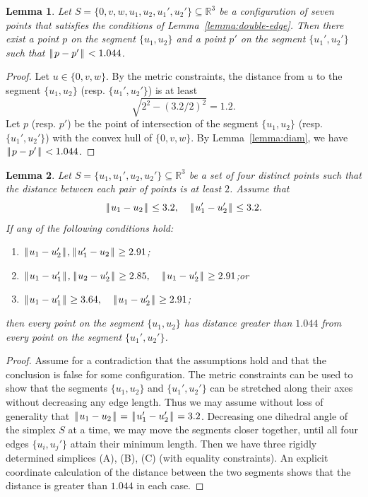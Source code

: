 \documentclass[11pt]{amsart}
\newcommand{\ring}[1]{\mathbb{#1}}
\def\|{{\hskip0.1em|\hskip-0.15em|\hskip0.1em}}
\let\subset=\subseteq
\newtheorem{lemma}{Lemma}
\begin{document}
\begin{lemma}\label{lemma:7small}  
Let $S=\{0,v,w,u_1,u_2,u_1',u_2'\}\subset\ring{R}^3$
be a configuration of seven points that satisfies
the conditions of Lemma~\ref{lemma:double-edge}.  Then there exist
a point $p$ on the segment $\{u_1,u_2\}$ and  a point $p'$ on the segment
$\{u_1',u_2'\}$ such that $\|p-p'\|<1.044$.
\end{lemma}

\begin{proof} Let $u\in\{0,v,w\}$.  By the metric constraints, the
distance from $u$ to the segment $\{u_1,u_2\}$ (resp. $\{u_1',u_2'\}$) is at least
$$\sqrt{2^2 - (3.2/2)^2} = 1.2.$$
Let $p$ (resp. $p'$) be the point of intersection of the segment $\{u_1,u_2\}$ 
(resp. $\{u_1',u_2'\}$) with
the convex hull of $\{0,v,w\}$.  By Lemma~\ref{lemma:diam},
we have $\|p-p'\|<1.044$.
\end{proof}

\begin{lemma}\label{lemma:abc}
Let $S=\{u_1,u_1',u_2,u_2'\}\subset\ring{R}^3$ be a set of four distinct points such that the distance between each pair of points is at least $2$.  Assume that
$$
\|u_1-u_2\|\le 3.2,\quad \|u_1'-u_2'\|\le 3.2.
$$
If any of the following conditions hold:
{
\renewcommand{\labelenumi}{(\Alph{enumi})~~}
\begin{enumerate}
\item $\|u_1-u_2'\|,\|u_1'-u_2\|\ge 2.91$;
\item $\|u_1-u_1'\|,\|u_2-u_2'\|\ge 2.85,\quad \|u_1-u_2'\|\ge 2.91$;\quad or
\item $\|u_1-u_1'\|\ge 3.64,\quad \|u_1-u_2'\|\ge 2.91$;
\end{enumerate}
}
then every point on the segment $\{u_1,u_2\}$ has distance greater than $1.044$ from every point on the segment $\{u_1',u_2'\}$.
\end{lemma}

\begin{proof} Assume for a contradiction that the assumptions hold and that
the conclusion is false for some configuration.  The metric constraints can be used to show that the segments $\{u_1,u_2\}$ and $\{u_1',u_2'\}$ can be stretched along their axes without decreasing any edge length.  
%
Thus we may assume without loss of generality that $\|u_1-u_2\|=\|u_1'-u_2'\|=3.2$.  Decreasing one dihedral angle of the simplex $S$ at a time, we may move the segments closer together, until all four edges $\{u_i,u_j'\}$ attain their minimum length.  
%
Then we have three rigidly determined simplices (A), (B), (C) (with equality constraints).  An explicit coordinate calculation of the distance between the two segments shows that the distance is greater than $1.044$ in each case.
\end{proof}
\end{document}
